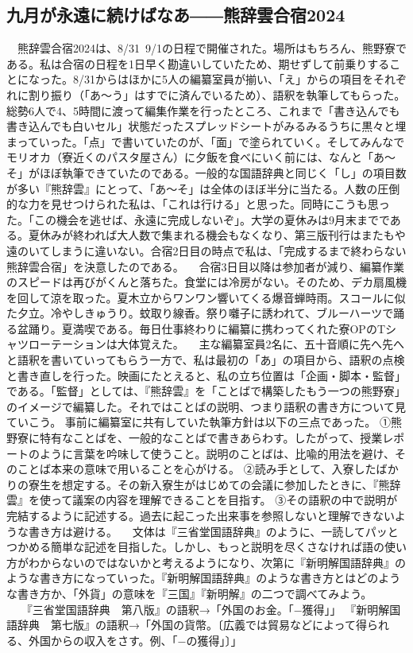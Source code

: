 \subsection{九月が永遠に続けばなあ――熊辞雲合宿2024}


　熊辞雲合宿2024は、8/31~9/1の日程で開催された。場所はもちろん、熊野寮である。私は合宿の日程を1日早く勘違いしていたため、期せずして前乗りすることになった。8/31からはほかに5人の編纂室員が揃い、「え」からの項目をそれぞれに割り振り（「あ〜う」はすでに済んでいるため）、語釈を執筆してもらった。総勢6人で4、5時間に渡って編集作業を行ったところ、これまで「書き込んでも書き込んでも白いセル」状態だったスプレッドシートがみるみるうちに黒々と埋まっていった。「点」で書いていたのが、「面」で塗られていく。そしてみんなでモリオカ（寮近くのパスタ屋さん）に夕飯を食べにいく前には、なんと「あ〜そ」がほぼ執筆できていたのである。一般的な国語辞典と同じく「し」の項目数が多い『熊辞雲』にとって、「あ〜そ」は全体のほぼ半分に当たる。人数の圧倒的な力を見せつけられた私は、「これは行ける」と思った。同時にこうも思った。「この機会を逃せば、永遠に完成しないぞ」。大学の夏休みは9月末までである。夏休みが終われば大人数で集まれる機会もなくなり、第三版刊行はまたもや遠のいてしまうに違いない。合宿2日目の時点で私は、「完成するまで終わらない熊辞雲合宿」を決意したのである。
　合宿3日目以降は参加者が減り、編纂作業のスピードは再びがくんと落ちた。食堂には冷房がない。そのため、デカ扇風機を回して涼を取った。夏木立からワンワン響いてくる爆音蝉時雨。スコールに似た夕立。冷やしきゅうり。蚊取り線香。祭り囃子に誘われて、ブルーハーツで踊る盆踊り。夏満喫である。毎日仕事終わりに編纂に携わってくれた寮OPのTシャツローテーションは大体覚えた。
　主な編纂室員2名に、五十音順に先へ先へと語釈を書いていってもらう一方で、私は最初の「あ」の項目から、語釈の点検と書き直しを行った。映画にたとえると、私の立ち位置は「企画・脚本・監督」である。「監督」としては、『熊辞雲』を「ことばで構築したもう一つの熊野寮」のイメージで編纂した。それではことばの説明、つまり語釈の書き方について見ていこう。
事前に編纂室に共有していた執筆方針は以下の三点であった。
①熊野寮に特有なことばを、一般的なことばで書きあらわす。したがって、授業レポートのように言葉を吟味して使うこと。説明のことばは、比喩的用法を避け、そのことば本来の意味で用いることを心がける。
②読み手として、入寮したばかりの寮生を想定する。その新入寮生がはじめての会議に参加したときに、『熊辞雲』を使って議案の内容を理解できることを目指す。
③その語釈の中で説明が完結するように記述する。過去に起こった出来事を参照しないと理解できないような書き方は避ける。
　文体は『三省堂国語辞典』のように、一読してパッとつかめる簡単な記述を目指した。しかし、もっと説明を尽くさなければ語の使い方がわからないのではないかと考えるようになり、次第に『新明解国語辞典』のような書き方になっていった。『新明解国語辞典』のような書き方とはどのような書き方か、「外貨」の意味を『三国』『新明解』の二つで調べてみよう。
　
『三省堂国語辞典　第八版』の語釈→「外国のお金。「−獲得」」
『新明解国語辞典　第七版』の語釈→「外国の貨幣。〔広義では貿易などによって得られる、外国からの収入をさす。例、「−の獲得」〕」
 
